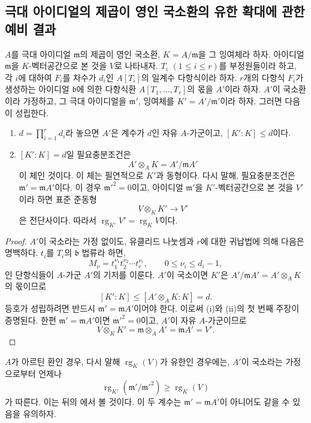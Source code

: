\subsection{극대 아이디얼의 제곱이 영인 국소환의 유한 확대에 관한 예비 결과}
\label{subsection:0.22.4-ko}
\label{0.22.4-ko}

\begin{proposition}[22.4.1]
\label{0.22.4.1-ko}
$A$를 극대 아이디얼 $\mathfrak m$의 제곱이 영인 국소환,
$K=A/\mathfrak m$을 그 잉여체라 하자. 아이디얼 $\mathfrak m$을
$K$-벡터공간으로 본 것을 $V$로 나타내자. $T_i$
$(1\leqslant i\leqslant r)$를 부정원들이라 하고, 각 $i$에 대하여
$F_i$를 차수가 $d_i$인 $A[T_i]$의 일계수 다항식이라 하자.
$r$개의 다항식 $F_i$가 생성하는 아이디얼 $\mathfrak b$에 의한
다항식환 $A[T_1,\ldots,T_r]$의 몫을 $A'$이라 하자. $A'$이 국소환이라
가정하고, 그 극대 아이디얼을 $\mathfrak m'$, 잉여체를
$K'=A'/\mathfrak m'$이라 하자. 그러면 다음이 성립한다.
\begin{enumerate}
  \item[(i)] $d=\prod_{i=1}^r d_i$라 놓으면 $A'$은 계수가 $d$인 자유
  $A$-가군이고, $[K':K]\leqslant d$이다.
  \item[(ii)] $[K':K]=d$일 필요충분조건은
  \[
    A'\otimes_AK=A'/\mathfrak mA'
  \]
  이 체인 것이다. 이 체는 필연적으로 $K'$과 동형이다. 다시 말해,
  필요충분조건은 $\mathfrak m'=\mathfrak mA'$이다. 이 경우
  $\mathfrak m'^2=0$이고, 아이디얼 $\mathfrak m'$을 $K'$-벡터공간으로
  본 것을 $V'$이라 하면 표준 준동형
  \[
    V\otimes_KK'\longrightarrow V'
  \]
  은 전단사이다. 따라서
  $\operatorname{rg}_{K'}V'=\operatorname{rg}_K V$이다.
\end{enumerate}
\end{proposition}

\begin{proof}
$A'$이 국소라는 가정 없이도, 유클리드 나눗셈과 $r$에 대한 귀납법에
의해 다음은 명백하다. $t_i$를 $T_i$의 $\mathfrak b$ 법류라 하면,
\[
  M_\nu=t_1^{\nu_1}t_2^{\nu_2}\cdots t_r^{\nu_r},
  \qquad 0\leqslant\nu_i\leqslant d_i-1,
\]
인 단항식들이 $A$-가군 $A'$의 기저를 이룬다. $A'$이 국소이면
$K'$은 $A'/\mathfrak mA'=A'\otimes_AK$의 몫이므로
\[
  [K':K]\leqslant[A'\otimes_AK:K]=d.
\]
등호가 성립하려면 반드시 $\mathfrak m'=\mathfrak mA'$이어야 한다.
이로써 (i)와 (ii)의 첫 번째 주장이 증명된다. 한편
$\mathfrak m'=\mathfrak mA'$이면 $\mathfrak m'^2=0$이고,
$A'$이 자유 $A$-가군이므로
\[
  V\otimes_KK'=\mathfrak m\otimes_AA'
  =\mathfrak mA'=V'.
\]
\end{proof}

\begin{remark}[22.4.2]
\label{0.22.4.2-ko}
$A$가 아르틴 환인 경우, 다시 말해 $\operatorname{rg}_K(V)$가 유한인
경우에는, $A'$이 국소라는 가정으로부터 언제나
\[
  \operatorname{rg}_{K'}(\mathfrak m'/\mathfrak m'^2)
  \geqslant\operatorname{rg}_K(V)
\]
가 따른다. 이는 뒤의 에서 볼 것이다. 이 두 계수는
$\mathfrak m'=\mathfrak mA'$이 아니어도 같을 수 있음을 유의하자.
\end{remark}

